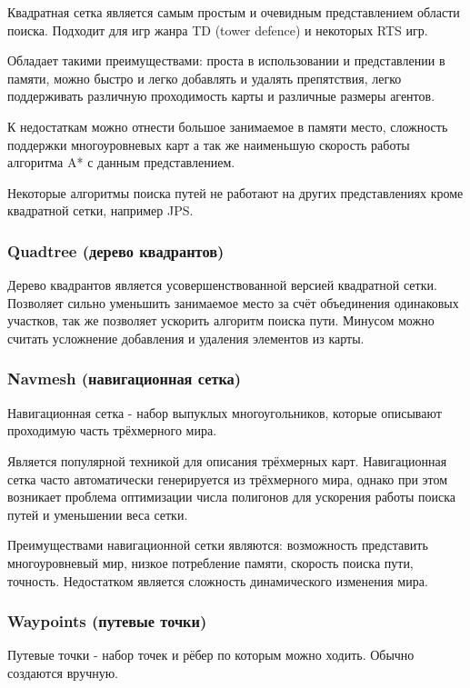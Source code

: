 Квадратная сетка является самым простым и очевидным представлением области поиска. Подходит для игр жанра TD (tower defence) и некоторых RTS игр. 

Обладает такими преимуществами: проста в использовании и представлении в памяти, можно быстро и легко добавлять и удалять препятствия, легко поддерживать различную проходимость карты и различные размеры агентов. 

К недостаткам можно отнести большое занимаемое в памяти место, сложность поддержки многоуровневых карт а так же наименьшую скорость работы алгоритма A* с данным представлением. 

Некоторые алгоритмы поиска путей не работают на других представлениях кроме квадратной сетки, например JPS.

\subsubsection{Quadtree (дерево квадрантов)}

Дерево квадрантов является усовершенствованной версией квадратной сетки. Позволяет сильно уменьшить занимаемое место за счёт объединения одинаковых участков, так же позволяет ускорить алгоритм поиска пути. Минусом можно считать усложнение добавления и удаления элементов из карты.

\subsubsection{Navmesh (навигационная сетка)}

Навигационная сетка - набор выпуклых многоугольников, которые описывают проходимую часть трёхмерного мира. 

Является популярной техникой для описания трёхмерных карт. Навигационная сетка часто автоматически генерируется из трёхмерного мира, однако при этом возникает проблема оптимизации числа полигонов для ускорения работы поиска путей и уменьшении веса сетки.

Преимуществами навигационной сетки являются: возможность представить многоуровневый мир, низкое потребление памяти, скорость поиска пути, точность. Недостатком является сложность динамического изменения мира.

\subsubsection{Waypoints (путевые точки)}

Путевые точки - набор точек и рёбер по которым можно ходить. Обычно создаются вручную.

